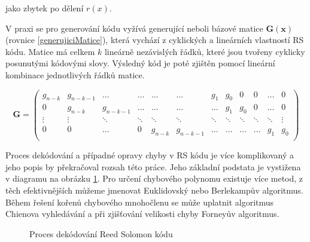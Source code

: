 \noindent jako zbytek po dělení $r(x)$. \cite{decodingRSCodesLiterature}

V praxi se pro generování kódu vyžívá generující neboli bázové matice
$\mathbf{G(x)}$ (rovnice \ref{generujiciMatice}), která vychází z cyklických a
lineárních vlastností RS kódu.
Matice má celkem $k$ lineárně nezávislých řádků, které jsou tvořeny cyklicky posunutými kódovými 
slovy. Výsledný kód je poté zjištěn pomocí lineární kombinace jednotlivých 
řádků matice. \cite{hallBCH}

\begin{equation}
  \mathbf{G} = \left(
    \begin{array}{cccccccccccc}
      g_{n-k} & g_{n-k-1} & \ldots & \ldots & \ldots & \ldots & g_{1} & g_{0} &
      0 & 0 & \ldots & 0 \\
      0 & g_{n-k} & g_{n-k-1} & \ldots & \ldots & \ldots & \ldots & g_{1} &
      g_{0} & 0 & \ldots & 0 \\
      \vdots & \vdots & \ddots & \ddots & \ddots & \ddots & \ddots & \ddots &
      \ddots & \ddots & \ddots & \vdots \\
      0 & 0 & \ldots & 0 & g_{n-k} & g_{n-k-1} & \ldots & \ldots & \ldots &
      \ldots & g_{1} & g_{0} \\
    \end{array}
  \right)
  \label{generujiciMatice}
\end{equation}

Proces dekódování a případné opravy chyby v RS kódu je více komplikovaný a jeho
popis by překračoval rozsah této práce. Jeho základní podstata je vystižena v
diagramu na obrázku \ref{ReedSolomonDecodingProcess}. Pro určení chybového
polynomu existuje více metod, z těch efektivnějších můžeme jmenovat Euklidovský nebo Berlekampův algoritmus. 
Během řešení kořenů chybového mnohočlenu se může uplatnit algoritmus Chienova 
vyhledávání a při zjišťování velikosti chyby Forneyův algoritmus.
\cite{decodingRSCodesLiterature}

\begin{figure}[H]
  \begin{center}
    \caption{Proces dekódování Reed Solomon kódu}
    \label{ReedSolomonDecodingProcess}
  \end{center}
\end{figure}


